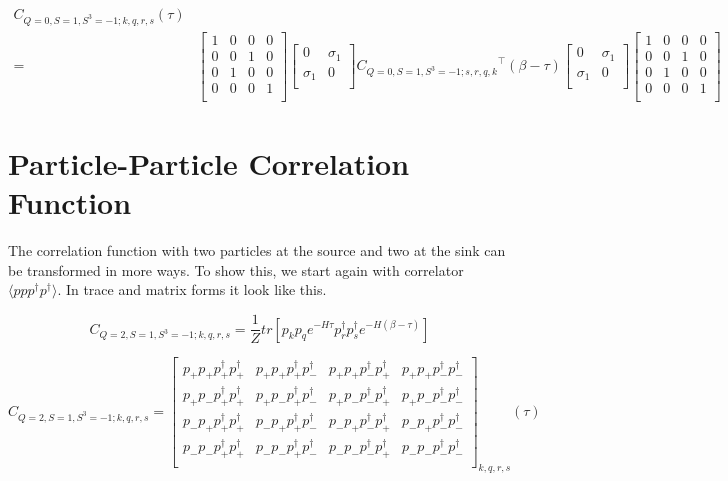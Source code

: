 \begin{equation}
  \begin{aligned}
    C_{Q=0,S=1,S^3=-1;k,q,r,s} (\tau) \\
    =& \left[ {\begin{array}{cccc}
      1 & 0 & 0 & 0 \\
      0 & 0 & 1 & 0 \\
      0 & 1 & 0 & 0 \\
      0 & 0 & 0 & 1 \\
    \end{array} } \right]
    \left[ {\begin{array}{cc}
      0 & \sigma_1 \\
      \sigma_1 & 0 \\
    \end{array} } \right]
    {C_{Q=0,S=1,S^3=-1;s,r,q,k}}^\top (\beta-\tau)
    \left[ {\begin{array}{cc}
      0 & \sigma_1 \\
      \sigma_1 & 0 \\
    \end{array} } \right]
    \left[ {\begin{array}{cccc}
      1 & 0 & 0 & 0 \\
      0 & 0 & 1 & 0 \\
      0 & 1 & 0 & 0 \\
      0 & 0 & 0 & 1 \\
    \end{array} } \right]
  \end{aligned}
\end{equation}

\section{Particle-Particle Correlation Function}

The correlation function with two particles at the source and two at the sink can be transformed in more ways. To show this, we start again with correlator $\langle ppp^\dagger p^\dagger\rangle$. In trace and matrix forms it look like this.

\begin{equation}
  C_{Q=2,S=1,S^3=-1;k,q,r,s} = \frac{1}{Z}tr\left[p_kp_qe^{-H\tau}p^\dagger_rp^\dagger_se^{-H\left(\beta-\tau\right)}\right]
\end{equation}

\renewcommand{\cor}[4]{p_{#1}p_{#2}p^\dagger_{#3}p^\dagger_{#4}}
\begin{equation}
  C_{Q=2,S=1,S^3=-1;k,q,r,s} =
  \left[
  \begin{array}{cccc}
    \cor{+}{+}{+}{+} & \cor{+}{+}{+}{-} & \cor{+}{+}{-}{+} & \cor{+}{+}{-}{-} \\
    \cor{+}{-}{+}{+} & \cor{+}{-}{+}{-} & \cor{+}{-}{-}{+} & \cor{+}{-}{-}{-} \\
    \cor{-}{+}{+}{+} & \cor{-}{+}{+}{-} & \cor{-}{+}{-}{+} & \cor{-}{+}{-}{-} \\
    \cor{-}{-}{+}{+} & \cor{-}{-}{+}{-} & \cor{-}{-}{-}{+} & \cor{-}{-}{-}{-} \\
  \end{array}
  \right]_{k,q,r,s} (\tau)
\end{equation}

